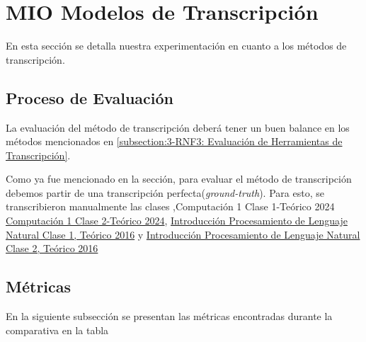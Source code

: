 
\section{MIO Modelos de Transcripción}
\label{section:6-1-Modelos de Transcripción}

En esta sección se detalla nuestra experimentación en cuanto a los métodos de transcripción.

\subsection{Proceso de Evaluación}
\label{subsection:6-1-Proceso de Evaluación}

La evaluación del método de transcripción deberá tener un buen balance en los métodos mencionados en \autoref{subsection:3-RNF3: Evaluación de Herramientas de Transcripción}.

Como ya fue mencionado en la sección, para evaluar el método de transcripción debemos partir de una transcripción perfecta(\textit{ground-truth}). Para esto, se transcribieron manualmente las clases \href{https://open.fing.edu.uy/courses/comp1-2024/2/},{Computación 1 Clase 1-Teórico 2024}
\href{https://open.fing.edu.uy/courses/comp1-2024/1/}{Computación 1 Clase 2-Teórico 2024}, \href{https://open.fing.edu.uy/courses/pln/1}{Introducción Procesamiento de Lenguaje Natural Clase 1, Teórico 2016} y \href{https://open.fing.edu.uy/courses/pln/1/}{Introducción Procesamiento de Lenguaje Natural Clase 2, Teórico 2016}

\subsection{Métricas}
En la siguiente subsección se presentan las métricas encontradas durante la comparativa en la tabla


